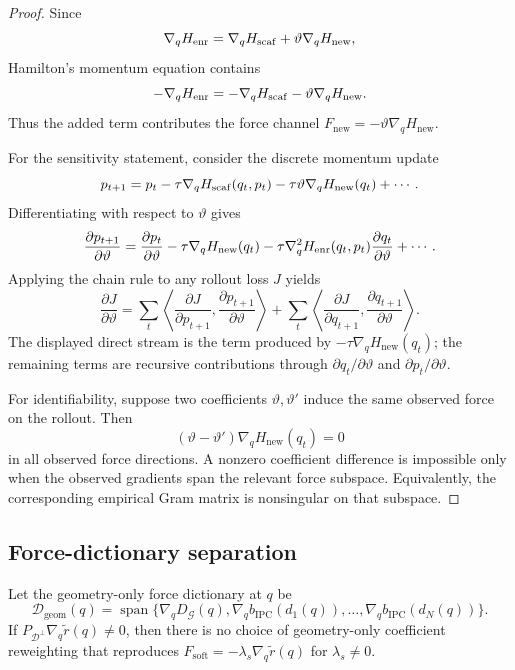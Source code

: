 \begin{proof}
Since
\[
    \nabla_q H_{\rm enr}
    =
    \nabla_q H_{\rm scaf}+\vartheta\nabla_qH_{\mathrm{new}},
\]
Hamilton's momentum equation contains
\[
    -\nabla_qH_{\rm enr}
    =
    -\nabla_qH_{\rm scaf}-\vartheta\nabla_qH_{\mathrm{new}}.
\]
Thus the added term contributes the force channel
\(F_{\mathrm{new}}=-\vartheta\nabla_qH_{\mathrm{new}}\).

For the sensitivity statement, consider the discrete momentum update
\[
    p_{t+1}
    =
    p_t-\tau\nabla_qH_{\rm scaf}(q_t,p_t)
    -\tau\vartheta\nabla_qH_{\mathrm{new}}(q_t)+\cdots .
\]
Differentiating with respect to \(\vartheta\) gives
\[
    \frac{\partial p_{t+1}}{\partial\vartheta}
    =
    \frac{\partial p_t}{\partial\vartheta}
    -\tau\nabla_qH_{\mathrm{new}}(q_t)
    -\tau\nabla_q^2H_{\rm enr}(q_t,p_t)
        \frac{\partial q_t}{\partial\vartheta}
    +\cdots .
\]
Applying the chain rule to any rollout loss \(J\) yields
\[
    \frac{\partial J}{\partial\vartheta}
    =
    \sum_t
    \left\langle
    \frac{\partial J}{\partial p_{t+1}},
    \frac{\partial p_{t+1}}{\partial\vartheta}
    \right\rangle
    +
    \sum_t
    \left\langle
    \frac{\partial J}{\partial q_{t+1}},
    \frac{\partial q_{t+1}}{\partial\vartheta}
    \right\rangle .
\]
The displayed direct stream is the term produced by
\(-\tau\nabla_qH_{\mathrm{new}}(q_t)\); the remaining terms are recursive
contributions through \(\partial q_t/\partial\vartheta\) and
\(\partial p_t/\partial\vartheta\).

For identifiability, suppose two coefficients \(\vartheta,\vartheta'\) induce the same
observed force on the rollout. Then
\[
    (\vartheta-\vartheta')\nabla_qH_{\mathrm{new}}(q_t)=0
\]
in all observed force directions. A nonzero coefficient difference is impossible only
when the observed gradients span the relevant force subspace. Equivalently, the
corresponding empirical Gram matrix is nonsingular on that subspace.
\end{proof}

\subsection{Force-dictionary separation}
\label{app:force_dictionary_separation}

\begin{lemma}
Let the geometry-only force dictionary at \(q\) be
\[
    \mathcal D_{\mathrm{geom}}(q)
    =
    \operatorname{span}\{\nabla_q D_{\mathcal G}(q),
    \nabla_q b_{\mathrm{IPC}}(d_1(q)),\ldots,
    \nabla_q b_{\mathrm{IPC}}(d_N(q))\}.
\]
If \(P_{\mathcal D^\perp}\nabla_q\widetilde r(q)\neq0\), then there is no
choice of geometry-only coefficient reweighting that reproduces
\(F_{\mathrm{soft}}=-\lambda_s\nabla_q\widetilde r(q)\) for
\(\lambda_s\neq0\).
\end{lemma}

